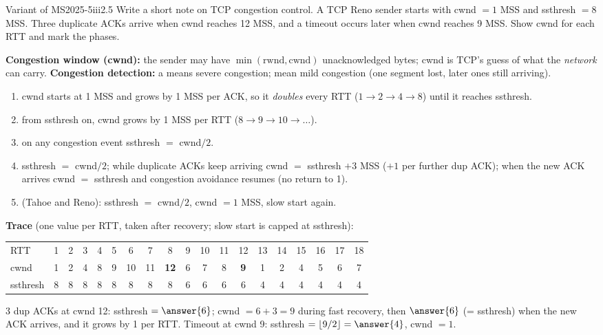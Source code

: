 \begin{question}{Variant of MS2025-5iii}{2.5}
Write a short note on TCP congestion control. A TCP Reno sender starts with cwnd $=1$ MSS and ssthresh $=8$ MSS. Three duplicate ACKs arrive when cwnd reaches 12 MSS, and a timeout occurs later when cwnd reaches 9 MSS. Show cwnd for each RTT and mark the phases.
\end{question}
\begin{solution}
\textbf{Congestion window (cwnd):} the sender may have $\min(\text{rwnd},\text{cwnd})$ unacknowledged bytes; cwnd is TCP's guess of what the \emph{network} can carry. \textbf{Congestion detection:} a  means severe congestion;  mean mild congestion (one segment lost, later ones still arriving).
\begin{enumerate}[label=\textbf{\arabic*.}]
\item {} cwnd starts at 1 MSS and grows by 1 MSS per ACK, so it \emph{doubles} every RTT ($1\to2\to4\to8$) until it reaches ssthresh.
\item {} from ssthresh on, cwnd grows by 1 MSS per RTT ($8\to9\to10\to\dots$).
\item {} on any congestion event ssthresh $=$ cwnd$/2$.
\item {} ssthresh $=$ cwnd$/2$; while duplicate ACKs keep arriving cwnd $=$ ssthresh $+3$ MSS ($+1$ per further dup ACK); when the new ACK arrives cwnd $=$ ssthresh and congestion avoidance resumes (no return to 1).
\item {} (Tahoe and Reno): ssthresh $=$ cwnd$/2$, cwnd $=1$ MSS, slow start again.
\end{enumerate}
\textbf{Trace} (one value per RTT, taken after recovery; slow start is capped at ssthresh):
\begin{center}\footnotesize\setlength{\tabcolsep}{3pt}
\begin{tabular}{l*{18}{c}}\toprule
RTT & 1&2&3&4&5&6&7&8&9&10&11&12&13&14&15&16&17&18\\
cwnd & 1&2&4&8&9&10&11&\textbf{12}&6&7&8&\textbf{9}&1&2&4&5&6&7\\
ssthresh & 8&8&8&8&8&8&8&8&6&6&6&6&4&4&4&4&4&4\\\bottomrule
\end{tabular}\end{center}
3 dup ACKs at cwnd 12: ssthresh $=\answer{6}$; cwnd $=6+3=9$ during fast recovery, then $\answer{6}$ (= ssthresh) when the new ACK arrives, and it grows by 1 per RTT. Timeout at cwnd 9: ssthresh $=\lfloor 9/2\rfloor=\answer{4}$, cwnd $=1$.
\end{solution}

